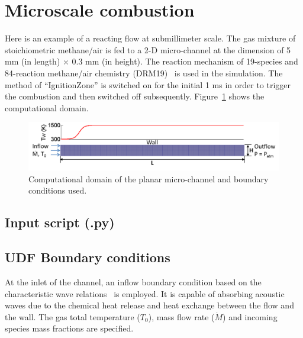
\section{Microscale combustion}
\label{micro-combustion}
%
Here is an example of a reacting flow at submillimeter scale. The gas mixture of
stoichiometric methane/air is fed to a 2-D micro-channel at the dimension of 5 mm
(in length) $\times$ 0.3 mm (in height). The reaction mechanism of 19-species and
84-reaction methane/air chemistry (DRM19)~\cite{DRM19} is used in the simulation.
The method of ``IgnitionZone'' is switched on for the initial 1 ms in order to
trigger the combustion and then switched off subsequently. Figure~\ref{fig:micro-combustion-domain}
shows the computational domain.

\begin{figure}[h]
\begin{center}
\includegraphics[width=15cm]{../2D/micro-combustion/computational_domain.png}
\caption{Computational domain of the planar micro-channel and boundary conditions used.}
\label{fig:micro-combustion-domain}
\end{center}
\end{figure}

\subsection{Input script (.py)}
%
\noindent\topbar

\bottombar

\subsection{UDF Boundary conditions}
%
At the inlet of the channel, an inflow boundary condition based on the characteristic
wave relations~\cite{Poi_JCP_1992} is employed. It is capable of absorbing acoustic waves
due to the chemical heat release and heat exchange between the flow and the wall. 
The gas total temperature ($T_0$), mass flow rate ($\dot{M}$) and incoming species
mass fractions are specified.\\
\noindent\topbar

\bottombar

